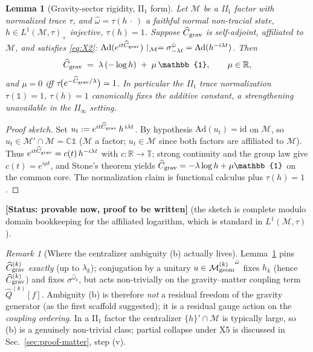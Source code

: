 \documentclass[11pt,a4paper]{article}
\newtheorem{lemma}[theorem]{Lemma}
\theoremstyle{definition}
\theoremstyle{remark}
\newtheorem{remark}[theorem]{Remark}
\newcommand{\MM}{\mathcal{M}}
\newcommand{\RR}{\mathbb{R}}
\newcommand{\CC}{\mathbb{C}}
\newcommand{\id}{\mathbb{1}}
\newcommand{\tr}{\tau}
\newcommand{\ctr}[1]{{#1}^{\hat\omega}}
\newcommand{\PROVABLE}{\textbf{[Status: provable now, proof to be written]}}
\begin{document}
\begin{lemma}[Gravity-sector rigidity, II$_1$
form]\label{lem:gravity-rigidity}
Let $\MM$ be a II$_1$ factor with normalized trace $\tr$, and
$\hat\omega=\tr(h\,\cdot\,)$ a faithful normal non-tracial
state, $h\in L^1(\MM,\tr)_+$ injective, $\tr(h)=1$. Suppose
$\widehat C_{\rm grav}$ is self-adjoint, affiliated to $\MM$,
and satisfies \eqref{eq:X2}:
$\mathrm{Ad}(e^{it\widehat C_{\rm grav}})\restriction_\MM
=\sigma^{\hat\omega}_{-\lambda t}=\mathrm{Ad}(h^{-i\lambda t})$.
Then
\[
  \widehat C_{\rm grav}\;=\;\lambda\,(-\log h)\;+\;\mu\,\id,
  \qquad \mu\in\RR,
\]
and $\mu=0$ iff $\tr\!\bigl(e^{-\widehat C_{\rm grav}/\lambda}
\bigr)=1$. In particular the II$_1$ trace normalization
$\tr(\id)=1$, $\tr(h)=1$ \emph{canonically fixes the additive
constant}, a strengthening unavailable in the II$_\infty$
setting.
\end{lemma}

\begin{proof}[Proof sketch]
Set $u_t:=e^{it\widehat C_{\rm grav}}\,h^{\,i\lambda t}$. By
hypothesis $\mathrm{Ad}(u_t)=\mathrm{id}$ on $\MM$, so
$u_t\in\MM'\cap\MM=\CC\id$ ($\MM$ a factor; $u_t\in\MM$ since
both factors are affiliated to $\MM$). Thus
$e^{it\widehat C_{\rm grav}}=c(t)\,h^{-i\lambda t}$ with
$c:\RR\to\mathbb T$; strong continuity and the group law give
$c(t)=e^{i\mu t}$, and Stone's theorem yields
$\widehat C_{\rm grav}=-\lambda\log h+\mu\id$ on the common
core. The normalization claim is functional calculus plus
$\tr(h)=1$.
\end{proof}

\PROVABLE{} (the sketch is complete modulo domain bookkeeping
for the affiliated logarithm, which is standard in
$L^1(\MM,\tr)$).

\begin{remark}[Where the centralizer ambiguity (b) actually
lives]\label{rem:centralizer}
Lemma~\ref{lem:gravity-rigidity} pins
$\widehat C_{\rm grav}^{(k)}$ \emph{exactly} (up to
$\lambda_k$); conjugation by a unitary
$u\in\ctr{\MM_{\rm geom}^{(k)}}$ fixes $h_k$ (hence
$\widehat C_{\rm grav}^{(k)}$) and fixes
$\sigma^{\hat\omega_k}$, but acts non-trivially on the
gravity--matter coupling term $\widehat Q^{(k)}[f]$. Ambiguity
(b) is therefore \emph{not} a residual freedom of the gravity
generator (as the first scaffold suggested); it is a residual
gauge action on the \emph{coupling ordering}. In a II$_1$
factor the centralizer $\{h\}'\cap\MM$ is typically large, so
(b) is a genuinely non-trivial class; partial collapse under
X5 is discussed in Sec.~\ref{sec:proof-matter}, step (v).
\end{remark}
\end{document}
